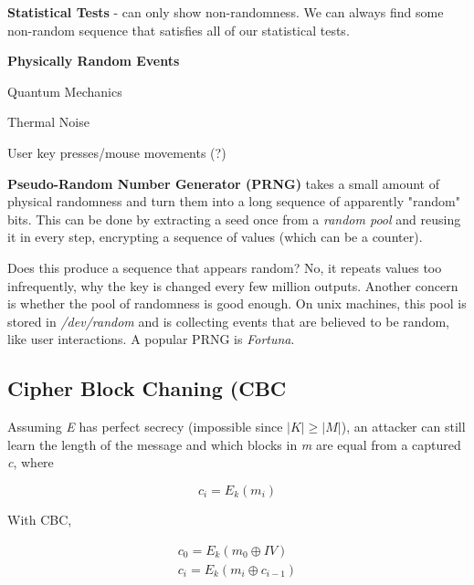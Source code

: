 \documentclass[12pt]{article}
\begin{document}
\textbf{Statistical Tests} - can only show non-randomness. We can always find some non-random sequence that satisfies all of our statistical tests.

\textbf{Physically Random Events}\begin{list}{*}{
\setlength{\itemsep}{0pt}
\setlength{\parsep}{0pt}
\setlength{\topsep}{0pt}
\setlength{\partopsep}{0pt}
\setlength{\leftmargin}{2em}
\setlength{\labelwidth}{1.5em}
\setlength{\labelsep}{0.5em}
}
\item Quantum Mechanics
\item Thermal Noise
\item User key presses/mouse movements (?)
\end{list}

\textbf{Pseudo-Random Number Generator (PRNG)} takes a small amount of physical randomness and turn them into a long sequence of apparently "random" bits. This can be done by extracting a seed once from a \emph{random pool} and reusing it in every step, encrypting a sequence of values (which can be a counter).

Does this produce a sequence that appears random? No, it repeats values too infrequently, why the key is changed every few million outputs. Another concern is whether the pool of randomness is good enough. On unix machines, this pool is stored in \emph{/dev/random} and is collecting events that are believed to be random, like user interactions. A popular PRNG is \emph{Fortuna}.
 
\subsection*{Cipher Block Chaning (CBC}
Assuming \emph{E} has perfect secrecy (impossible since $|K| \ge |M|$), an attacker can still learn the length of the message and which blocks in \emph{m} are equal from a captured \emph{c}, where

\begin{equation}
c_i = E_k(m_i)
\end{equation}

With CBC, 

\begin{equation}
\begin{split}
c_0 = E_k(m_0 \oplus IV) \\
c_i = E_k(m_i \oplus c_{i-1})
\end{split}
\end{equation}
\end{document}
